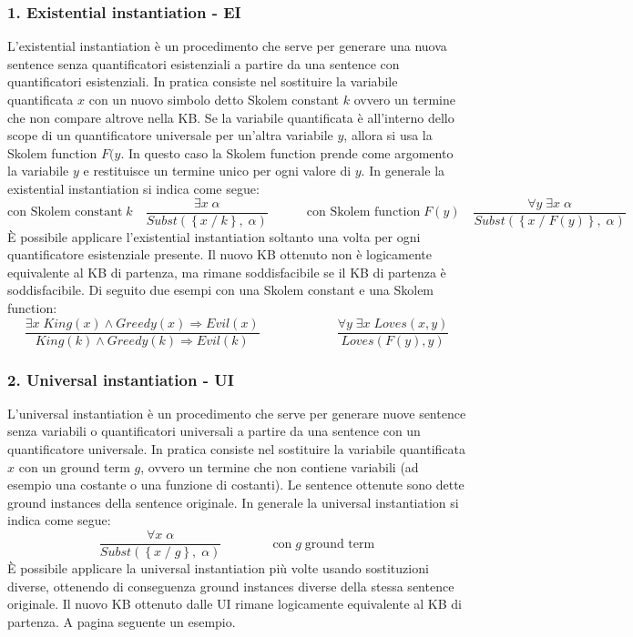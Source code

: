 \subsubsection*{1. Existential instantiation - EI}
L'existential instantiation è un procedimento che serve per generare una nuova sentence senza quantificatori esistenziali a
partire da una sentence con quantificatori esistenziali. In pratica consiste nel sostituire la variabile quantificata \(x\)
con un nuovo simbolo detto Skolem constant \(k\) ovvero un termine che non compare altrove nella KB. Se la variabile quantificata
è all'interno dello scope di un quantificatore universale per un'altra variabile \(y\), allora si usa la Skolem function \(F(y\).
In questo caso la Skolem function prende come argomento la variabile \(y\) e restituisce un termine unico per ogni valore di
\(y\). In generale la existential instantiation si indica come segue:
\[\text{con Skolem constant} \; k \quad \frac{\exists x \; \alpha}{Subst( \left\{ x \; / \; k \right\}, \; \alpha )} \qquad\quad \text{con Skolem function} \; F(y) \quad \frac{\forall y \; \exists x \; \alpha}{Subst( \left\{ x \; / \; F(y) \right\}, \; \alpha )}\]
È possibile applicare l'existential instantiation soltanto una volta per ogni quantificatore esistenziale presente. Il nuovo KB
ottenuto non è logicamente equivalente al KB di partenza, ma rimane soddisfacibile se il KB di partenza è soddisfacibile.
Di seguito due esempi con una Skolem constant e una Skolem function:
\[\frac{\exists x \; King(x) \land Greedy(x) \Rightarrow Evil(x)}{\textit{King}(k) \land \textit{Greedy}(k) \Rightarrow \textit{Evil}(k)} \qquad\qquad\qquad \frac{\forall y \; \exists x \; Loves(x, y)}{\textit{Loves}(F(y), y)}\]

\subsubsection*{2. Universal instantiation - UI}
L'universal instantiation è un procedimento che serve per generare nuove sentence senza variabili o quantificatori universali a
partire da una sentence con un quantificatore universale. In pratica consiste nel sostituire la variabile quantificata \(x\)
con un ground term \(g\), ovvero un termine che non contiene variabili (ad esempio una costante o una funzione di costanti).
Le sentence ottenute sono dette ground instances della sentence originale. In generale la universal instantiation si indica
come segue:
\[\frac{\forall x \; \alpha}{Subst( \left\{ x \; / \; g \right\}, \; \alpha )} \qquad\qquad \text{con} \; g \; \text{ground term}\]
È possibile applicare la universal instantiation più volte usando sostituzioni diverse, ottenendo di conseguenza ground instances
diverse della stessa sentence originale. Il nuovo KB ottenuto dalle UI rimane logicamente equivalente al KB di partenza.
A pagina seguente un esempio.

